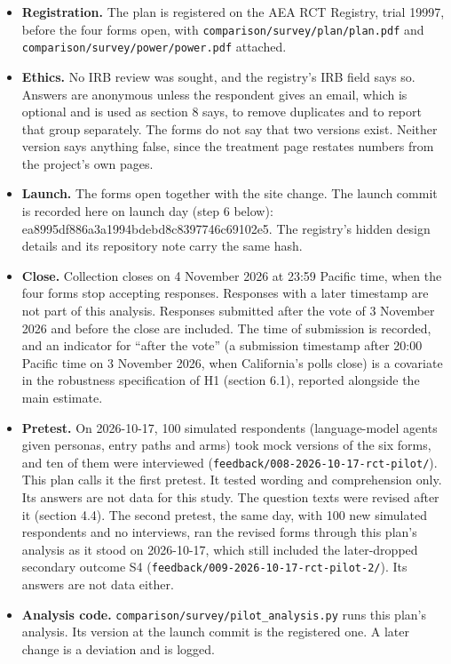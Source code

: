 \begin{itemize}
\tightlist
\item
  \textbf{Registration.} The plan is registered on the AEA RCT Registry, trial 19997, before the four
  forms open, with \texttt{comparison/survey/plan/plan.pdf} and \texttt{comparison/survey/power/power.pdf} attached.
\item
  \textbf{Ethics.} No IRB review was sought, and the registry's IRB field says so. Answers are anonymous
  unless the respondent gives an email, which is optional and is used as section 8 says, to remove
  duplicates and to report that group separately. The forms do not say that two versions exist.
  Neither version says anything false, since the treatment page restates numbers from the
  project's own pages.
\item
  \textbf{Launch.} The forms open together with the site change. The launch commit is recorded here on
  launch day (step 6 below): ea8995df886a3a1994bdebd8c8397746c69102e5. The registry's hidden
  design details and its repository note carry the same hash.
\item
  \textbf{Close.} Collection closes on 4 November 2026 at 23:59 Pacific time, when the four forms stop
  accepting responses. Responses with a later timestamp are not part of this analysis. Responses
  submitted after the vote of 3 November 2026 and before the close are included. The time of
  submission is recorded, and an indicator for ``after the vote'' (a submission timestamp after
  20:00 Pacific time on 3 November 2026, when California's polls close) is a covariate in the
  robustness specification of H1 (section 6.1), reported alongside the main estimate.
\item
  \textbf{Pretest.} On 2026-10-17, 100 simulated respondents (language-model agents given personas,
  entry paths and arms) took mock versions of the six forms, and ten of them were interviewed
  (\texttt{feedback/008-2026-10-17-rct-pilot/}). This plan calls it the first pretest. It tested wording
  and comprehension only. Its answers are not data for this study. The question texts were revised
  after it (section 4.4). The second pretest, the same day, with 100 new simulated respondents and
  no interviews, ran the revised forms through this plan's analysis as it stood on 2026-10-17,
  which still included the later-dropped secondary outcome S4
  (\texttt{feedback/009-2026-10-17-rct-pilot-2/}). Its answers are not data either.
\item
  \textbf{Analysis code.} \texttt{comparison/survey/pilot\_analysis.py} runs this plan's analysis. Its version at the launch commit is the registered one. A later change is a deviation and is logged.

\end{itemize}
